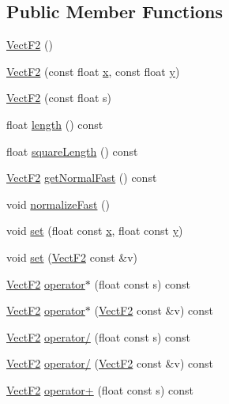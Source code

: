 \subsection*{Public Member Functions}
\begin{DoxyCompactItemize}
\item 
\hyperlink{classVectF2_a0d026a9d16bedb725df5c3b4474bd666}{Vect\-F2} ()
\item 
\hyperlink{classVectF2_aa99c7c273296eabd006395457faab9cf}{Vect\-F2} (const float \hyperlink{classVectF2_aa1751cb36f85aa579157bd8d511f5955}{x}, const float \hyperlink{classVectF2_a2d7333f3cbb480c0b7ba99a7cc96a72f}{y})
\item 
\hyperlink{classVectF2_a508257df17f17bb09e7a3fbf6337e805}{Vect\-F2} (const float s)
\item 
float \hyperlink{classVectF2_a5b6c896856229b1482d9139d0a03545a}{length} () const 
\item 
float \hyperlink{classVectF2_af0fa2539f8eff4b27f8fa544e4a38446}{square\-Length} () const 
\item 
\hyperlink{classVectF2}{Vect\-F2} \hyperlink{classVectF2_ab1a32457ae6188cdd961441d86dd716e}{get\-Normal\-Fast} () const 
\item 
void \hyperlink{classVectF2_a861b9fe61941ba536c5bbd033a7fcf55}{normalize\-Fast} ()
\item 
void \hyperlink{classVectF2_a9f74b7c136cb7fbe200a0ab0fe708d47}{set} (float const \hyperlink{classVectF2_aa1751cb36f85aa579157bd8d511f5955}{x}, float const \hyperlink{classVectF2_a2d7333f3cbb480c0b7ba99a7cc96a72f}{y})
\item 
void \hyperlink{classVectF2_a5b9767c95ea07e41452782eca81a65bf}{set} (\hyperlink{classVectF2}{Vect\-F2} const \&v)
\item 
\hyperlink{classVectF2}{Vect\-F2} \hyperlink{classVectF2_ae1a56dcd7a6dc071d2ab328a83727c39}{operator$\ast$} (float const s) const 
\item 
\hyperlink{classVectF2}{Vect\-F2} \hyperlink{classVectF2_a5d9ec123a0634df733f0354743153f43}{operator$\ast$} (\hyperlink{classVectF2}{Vect\-F2} const \&v) const 
\item 
\hyperlink{classVectF2}{Vect\-F2} \hyperlink{classVectF2_aac004109e19dff08e88d57f1dbd0a3ee}{operator/} (float const s) const 
\item 
\hyperlink{classVectF2}{Vect\-F2} \hyperlink{classVectF2_a3788cae966b827e0de547d21abd9e072}{operator/} (\hyperlink{classVectF2}{Vect\-F2} const \&v) const 
\item 
\hyperlink{classVectF2}{Vect\-F2} \hyperlink{classVectF2_a6ead5d0b5f313388a03da1172589e17c}{operator+} (float const s) const 

\end{DoxyCompactItemize}
